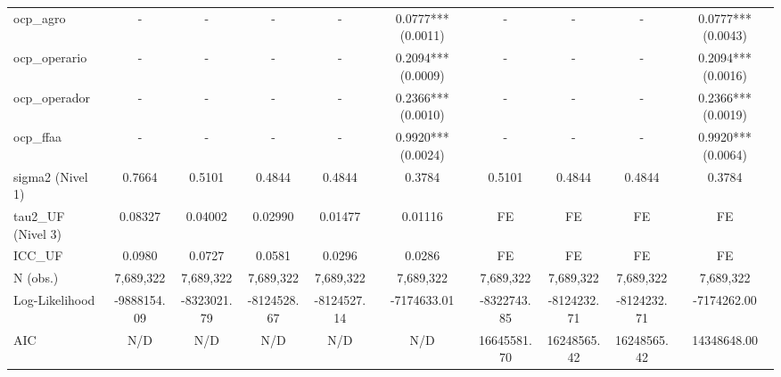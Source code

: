 \begin{table}
\begin{tabular}{lccccccccc}
ocp_agro & - & - & - & - & 0.0777*** (0.0011) & - & - & - & 0.0777*** (0.0043) \\
ocp_operario & - & - & - & - & 0.2094*** (0.0009) & - & - & - & 0.2094*** (0.0016) \\
ocp_operador & - & - & - & - & 0.2366*** (0.0010) & - & - & - & 0.2366*** (0.0019) \\
ocp_ffaa & - & - & - & - & 0.9920*** (0.0024) & - & - & - & 0.9920*** (0.0064) \\
sigma2 (Nivel 1) & 0.7664 & 0.5101 & 0.4844 & 0.4844 & 0.3784 & 0.5101 & 0.4844 & 0.4844 & 0.3784 \\
tau2_UF (Nivel 3) & 0.08327 & 0.04002 & 0.02990 & 0.01477 & 0.01116 & FE & FE & FE & FE \\
ICC_UF & 0.0980 & 0.0727 & 0.0581 & 0.0296 & 0.0286 & FE & FE & FE & FE \\
N (obs.) & 7,689,322 & 7,689,322 & 7,689,322 & 7,689,322 & 7,689,322 & 7,689,322 & 7,689,322 & 7,689,322 & 7,689,322 \\
Log-Likelihood & -9888154.09 & -8323021.79 & -8124528.67 & -8124527.14 & -7174633.01 & -8322743.85 & -8124232.71 & -8124232.71 & -7174262.00 \\
AIC & N/D & N/D & N/D & N/D & N/D & 16645581.70 & 16248565.42 & 16248565.42 & 14348648.00 \\
\bottomrule
\end{tabular}
\end{table}

